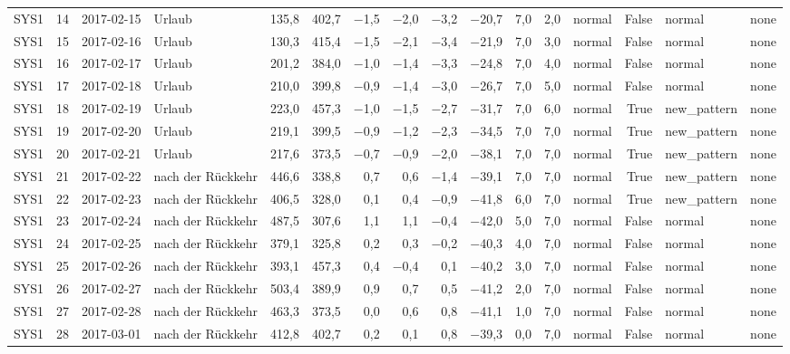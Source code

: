 \begin{tabular}{lrllrrrrrrrrlrll}
SYS1 & 14 & 2017-02-15 & Urlaub & 135,8 & 402,7 & $-$1,5 & $-$2,0 & $-$3,2 & $-$20,7 & 7,0 & 2,0 & normal & False & normal & none \\
SYS1 & 15 & 2017-02-16 & Urlaub & 130,3 & 415,4 & $-$1,5 & $-$2,1 & $-$3,4 & $-$21,9 & 7,0 & 3,0 & normal & False & normal & none \\
SYS1 & 16 & 2017-02-17 & Urlaub & 201,2 & 384,0 & $-$1,0 & $-$1,4 & $-$3,3 & $-$24,8 & 7,0 & 4,0 & normal & False & normal & none \\
SYS1 & 17 & 2017-02-18 & Urlaub & 210,0 & 399,8 & $-$0,9 & $-$1,4 & $-$3,0 & $-$26,7 & 7,0 & 5,0 & normal & False & normal & none \\
SYS1 & 18 & 2017-02-19 & Urlaub & 223,0 & 457,3 & $-$1,0 & $-$1,5 & $-$2,7 & $-$31,7 & 7,0 & 6,0 & normal & True & new\_pattern & none \\
SYS1 & 19 & 2017-02-20 & Urlaub & 219,1 & 399,5 & $-$0,9 & $-$1,2 & $-$2,3 & $-$34,5 & 7,0 & 7,0 & normal & True & new\_pattern & none \\
SYS1 & 20 & 2017-02-21 & Urlaub & 217,6 & 373,5 & $-$0,7 & $-$0,9 & $-$2,0 & $-$38,1 & 7,0 & 7,0 & normal & True & new\_pattern & none \\
SYS1 & 21 & 2017-02-22 & nach der Rückkehr & 446,6 & 338,8 & 0,7 & 0,6 & $-$1,4 & $-$39,1 & 7,0 & 7,0 & normal & True & new\_pattern & none \\
SYS1 & 22 & 2017-02-23 & nach der Rückkehr & 406,5 & 328,0 & 0,1 & 0,4 & $-$0,9 & $-$41,8 & 6,0 & 7,0 & normal & True & new\_pattern & none \\
SYS1 & 23 & 2017-02-24 & nach der Rückkehr & 487,5 & 307,6 & 1,1 & 1,1 & $-$0,4 & $-$42,0 & 5,0 & 7,0 & normal & False & normal & none \\
SYS1 & 24 & 2017-02-25 & nach der Rückkehr & 379,1 & 325,8 & 0,2 & 0,3 & $-$0,2 & $-$40,3 & 4,0 & 7,0 & normal & False & normal & none \\
SYS1 & 25 & 2017-02-26 & nach der Rückkehr & 393,1 & 457,3 & 0,4 & $-$0,4 & 0,1 & $-$40,2 & 3,0 & 7,0 & normal & False & normal & none \\
SYS1 & 26 & 2017-02-27 & nach der Rückkehr & 503,4 & 389,9 & 0,9 & 0,7 & 0,5 & $-$41,2 & 2,0 & 7,0 & normal & False & normal & none \\
SYS1 & 27 & 2017-02-28 & nach der Rückkehr & 463,3 & 373,5 & 0,0 & 0,6 & 0,8 & $-$41,1 & 1,0 & 7,0 & normal & False & normal & none \\
SYS1 & 28 & 2017-03-01 & nach der Rückkehr & 412,8 & 402,7 & 0,2 & 0,1 & 0,8 & $-$39,3 & 0,0 & 7,0 & normal & False & normal & none \\

\end{tabular}
